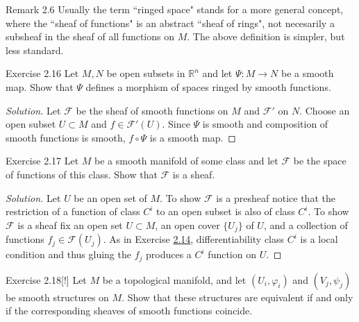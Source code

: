 \begin{thing5}{Remark 2.6}\leavevmode
	Usually the term ``ringed space" stands for a more general concept, where the ``sheaf of functions" is an abstract ``sheaf of rings", not necesarily a subsheaf in the sheaf of all functions on  $M$. The above definition is simpler, but less standard.
\end{thing5}

\begin{thing4}{Exercise 2.16}\label{exer:2.16}\leavevmode
Let $M, N$ be open subsets in $\mathbb{R}^n$ and let  $\Psi:M \to N$ be a smooth map. Show that $\Psi$ defines a morphism of spaces ringed by smooth functions.
\end{thing4}

\begin{proof}[Solution]\leavevmode
Let $\mathcal{F}$ be the sheaf of smooth functions on $M$ and  $\mathcal{F}'$ on $N$. Choose an open subset $U\subset M$ and $f \in \mathcal{F}'(U)$. Since $\Psi$ is smooth and composition of smooth functions is smooth, $f \circ \Psi$ is a smooth map.
\end{proof}

\begin{thing4}{Exercise 2.17}\label{exer:2.17}\leavevmode
Let $M$ be a smooth manifold of some class and let $\mathcal{F}$ be the space of functions of this class. Show that $\mathcal{F}$ is a sheaf.
\end{thing4}

\begin{proof}[Solution]\leavevmode
Let $U$ be an open set of $M$. To show $\mathcal{F}$ is a presheaf notice that the restriction of a function of class $C^i$ to an open subset is also of class $C^i$. To show $\mathcal{F}$ is a sheaf fix an open set $U \subset M$, an open cover $\{U_j\}$ of $U$, and a collection of functions $f_j \in \mathcal{F}(U_j)$. As in Exercise \hyperref[exer:2.14]{2.14}, differentiability class $C^i$ is a local condition and thus gluing the $f_j$ produces a $C^i$ function on $U$.
\end{proof}

\begin{thing4}{Exercise 2.18}[!]\label{exer:2.18}\leavevmode
Let $M$ be a topological manifold, and let $(U_i,\varphi_i)$ and $(V_j,\psi_j)$ be smooth structures on $M$. Show that these structures are equivalent if and only if the corresponding sheaves of smooth functions coincide.
\end{thing4}

